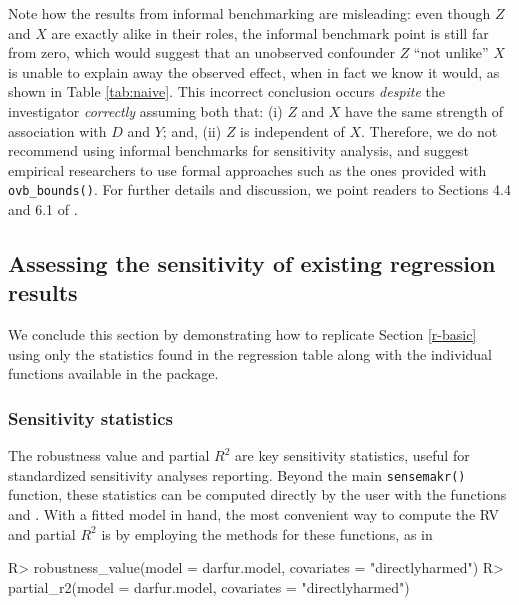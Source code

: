\documentclass[
]{jss}
\begin{document}
Note how the results from informal benchmarking are misleading: even
though \(Z\) and \(X\) are exactly alike in their roles, the informal
benchmark point is still far from zero, which would suggest that an
unobserved confounder \(Z\) ``not unlike'' \(X\) is unable to explain
away the observed effect, when in fact we know it would, as shown in
Table \ref{tab:naive}. This incorrect conclusion occurs \emph{despite}
the investigator \emph{correctly} assuming both that: (i) \(Z\) and
\(X\) have the same strength of association with \(D\) and \(Y\); and,
(ii) \(Z\) is independent of \(X\). Therefore, we do not recommend using
informal benchmarks for sensitivity analysis, and suggest empirical
researchers to use formal approaches such as the ones provided with
\texttt{ovb\_bounds()}. For further details and discussion, we point
readers to Sections 4.4 and 6.1 of \citet{cinelli:jrssb2019}.

\hypertarget{print}{%
\subsection{Assessing the sensitivity of existing regression
results}\label{print}}

We conclude this section by demonstrating how to replicate Section
\ref{r-basic} using only the statistics found in the regression table
along with the individual functions available in the package.

\hypertarget{sensitivity-statistics}{%
\subsubsection{Sensitivity statistics}\label{sensitivity-statistics}}

The robustness value and partial \(R^2\) are key sensitivity statistics,
useful for standardized sensitivity analyses reporting. Beyond the main
\texttt{sensemakr()} function, these statistics can be computed directly
by the user with the functions  and
. With a fitted  model in hand, the most
convenient way to compute the RV and partial \(R^2\) is by employing the
 methods for these functions, as in

\begin{CodeChunk}

\begin{CodeInput}
R> robustness_value(model = darfur.model, covariates = "directlyharmed")
R> partial_r2(model = darfur.model, covariates = "directlyharmed")
\end{CodeInput}
\end{CodeChunk}
\end{document}
